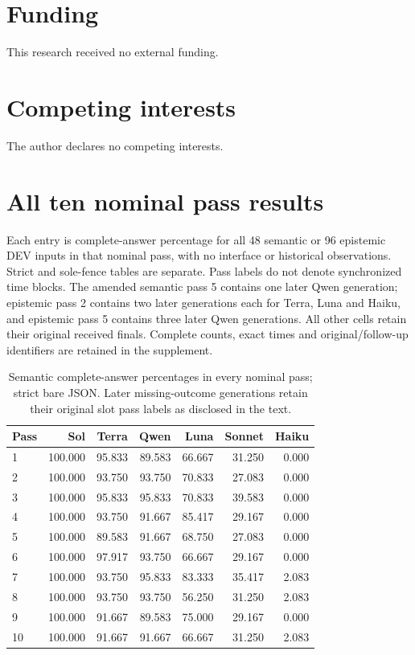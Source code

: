 \documentclass[a4paper,preprint,12pt,numbers,nopreprintline]{elsarticle}
\begin{document}
\section*{Funding}
This research received no external funding.

\section*{Competing interests}
The author declares no competing interests.

\clearpage\appendix
\section{All ten nominal pass results}\label{app:all-rounds}
Each entry is complete-answer percentage for all 48 semantic or 96 epistemic DEV inputs in that nominal pass, with no interface or historical observations. Strict and sole-fence tables are separate. Pass labels do not denote synchronized time blocks. The amended semantic pass 5 contains one later Qwen generation; epistemic pass 2 contains two later generations each for Terra, Luna and Haiku, and epistemic pass 5 contains three later Qwen generations. All other cells retain their original received finals. Complete counts, exact times and original/follow-up identifiers are retained in the supplement.
\begin{table}[htbp]\centering\scriptsize
\caption{Semantic complete-answer percentages in every nominal pass; strict bare JSON. Later missing-outcome generations retain their original slot pass labels as disclosed in the text.}\label{tab:rounds-semantic-primary}
\setlength{\tabcolsep}{3pt}
\begin{tabular}{lrrrrrr}\toprule
Pass & Sol & Terra & Qwen & Luna & Sonnet & Haiku\\\midrule
1 & 100.000 & 95.833 & 89.583 & 66.667 & 31.250 & 0.000\\
2 & 100.000 & 93.750 & 93.750 & 70.833 & 27.083 & 0.000\\
3 & 100.000 & 95.833 & 95.833 & 70.833 & 39.583 & 0.000\\
4 & 100.000 & 93.750 & 91.667 & 85.417 & 29.167 & 0.000\\
5 & 100.000 & 89.583 & 91.667 & 68.750 & 27.083 & 0.000\\
6 & 100.000 & 97.917 & 93.750 & 66.667 & 29.167 & 0.000\\
7 & 100.000 & 93.750 & 95.833 & 83.333 & 35.417 & 2.083\\
8 & 100.000 & 93.750 & 93.750 & 56.250 & 31.250 & 2.083\\
9 & 100.000 & 91.667 & 89.583 & 75.000 & 29.167 & 0.000\\
10 & 100.000 & 91.667 & 91.667 & 66.667 & 31.250 & 2.083\\
\bottomrule\end{tabular}
\end{table}
\end{document}

